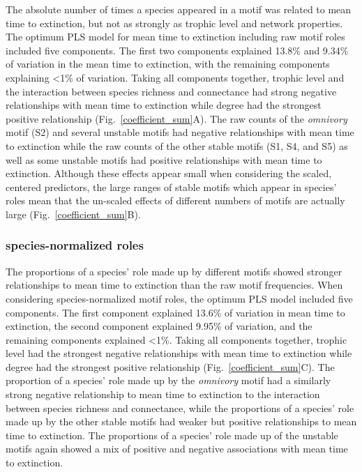\documentclass[12pt]{article}
\begin{document}
\begin{spacing}{2.0}
            The absolute number of times a species appeared in a motif was related to mean time to extinction, but not as strongly as trophic level and network properties.
            The optimum PLS model for mean time to extinction including raw motif roles included five components.
            The first two components explained 13.8\% and 9.34\% of variation in the mean time to extinction, with the remaining components explaining \textless1\% of variation.
            Taking all components together, trophic level and the interaction between species richness and connectance had strong negative relationships with mean time to extinction while degree had the strongest positive relationship (Fig.~\ref{coefficient_sum}A).
            The raw counts of the \emph{omnivory} motif (S2) and several unstable motifs had negative relationships with mean time to extinction while
            the raw counts of the other stable motifs (S1, S4, and S5) as well as some unstable motifs had positive relationships with mean time to extinction.
            Although these effects appear small when considering the scaled, centered predictors, the large ranges of stable motifs which appear in species' roles mean that the un-scaled effects of different numbers of motifs are actually large (Fig.~\ref{coefficient_sum}B).
                
        \subsubsection*{species-normalized roles}
        
    		The proportions of a species' role made up by different motifs showed stronger relationships to mean time to extinction than the raw motif frequencies.
    		When considering species-normalized motif roles, the optimum PLS model included five components.
    		The first component explained 13.6\% of variation in mean time to extinction, the second component explained 9.95\% of variation, and the remaining components explained \textless1\%.
            Taking all components together, trophic level had the strongest negative relationships with mean time to extinction while degree had the strongest positive relationship (Fig.~\ref{coefficient_sum}C).
            The proportion of a species' role made up by the \emph{omnivory} motif had a similarly strong negative relationship to mean time to extinction to the interaction between species richness and connectance, while the proportions of a species' role made up by the other stable motifs had weaker but positive relationships to mean time to extinction.
            The proportions of a species' role made up of the unstable motifs again showed a mix of positive and negative associations with mean time to extinction.


\end{spacing}
\end{document}
